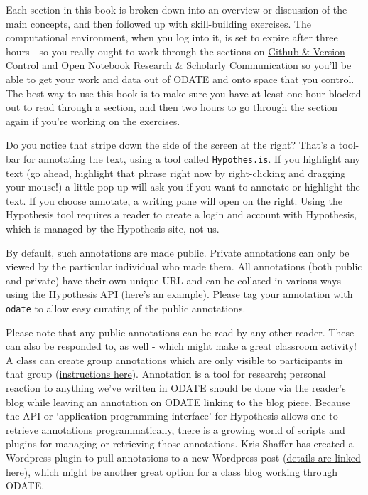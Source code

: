\documentclass[english,]{book}
\begin{document}
Each section in this book is broken down into an overview or discussion
of the main concepts, and then followed up with skill-building
exercises. The computational environment, when you log into it, is set
to expire after three hours - so you really ought to work through the
sections on \protect\hyperlink{github-version-control}{Github \& Version
Control} and
\protect\hyperlink{open-notebook-research-scholarly-communication}{Open
Notebook Research \& Scholarly Communication} so you'll be able to get
your work and data out of ODATE and onto space that you control. The
best way to use this book is to make sure you have at least one hour
blocked out to read through a section, and then two hours to go through
the section again if you're working on the exercises.

Do you notice that stripe down the side of the screen at the right?
That's a tool-bar for annotating the text, using a tool called
\texttt{Hypothes.is}. If you highlight any text (go ahead, highlight
that phrase right now by right-clicking and dragging your mouse!) a
little pop-up will ask you if you want to annotate or highlight the
text. If you choose annotate, a writing pane will open on the right.
Using the Hypothesis tool requires a reader to create a login and
account with Hypothesis, which is managed by the Hypothesis site, not
us.

By default, such annotations are made public. Private annotations can
only be viewed by the particular individual who made them. All
annotations (both public and private) have their own unique URL and can
be collated in various ways using the Hypothesis API (here's an
\href{http://jonudell.net/h/facet.html}{example}). Please tag your
annotation with \texttt{odate} to allow easy curating of the public
annotations.

Please note that any public annotations can be read by any other reader.
These can also be responded to, as well - which might make a great
classroom activity! A class can create group annotations which are only
visible to participants in that group
(\href{https://hypothes.is/blog/introducing-groups/}{instructions
here}). Annotation is a tool for research; personal reaction to anything
we've written in ODATE should be done via the reader's blog while
leaving an annotation on ODATE linking to the blog piece. Because the
API or `application programming interface' for Hypothesis allows one to
retrieve annotations programmatically, there is a growing world of
scripts and plugins for managing or retrieving those annotations. Kris
Shaffer has created a Wordpress plugin to pull annotations to a new
Wordpress post
(\href{http://pushpullfork.com/2016/08/hypothesis-aggregator/}{details
are linked here}), which might be another great option for a class blog
working through ODATE.
\end{document}
